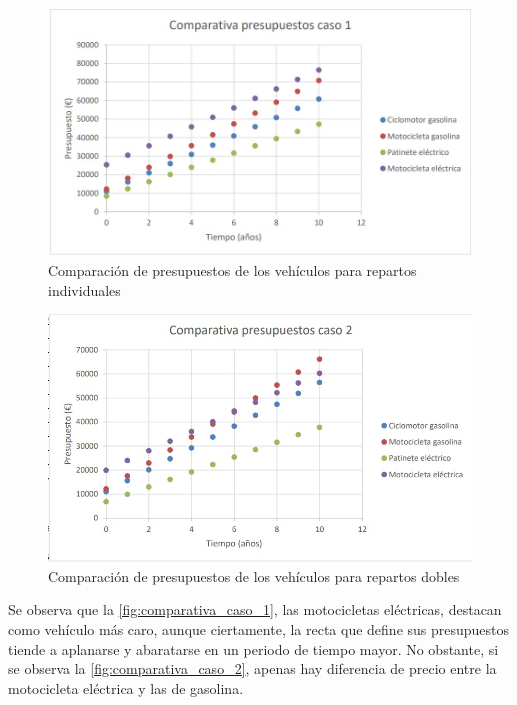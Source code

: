 \begin{figure}[h]
    \centering
    \includegraphics[scale = 0.4]{archivos/Comparativa_presupuestos_caso_1.jpeg}
    \caption{Comparación de presupuestos de los vehículos para repartos individuales}
    \label{fig:comparativa_caso_1}
\end{figure}

\begin{figure}[h]
    \centering
    \includegraphics[scale = 0.4]{archivos/Comparativa_presupuestos_caso_2.jpeg}
    \caption{Comparación de presupuestos de los vehículos para repartos dobles}
    \label{fig:comparativa_caso_2}
\end{figure}

Se observa que la \autoref{fig:comparativa_caso_1}, las motocicletas eléctricas, destacan como vehículo más caro, aunque ciertamente, la recta que define sus presupuestos tiende a aplanarse y abaratarse en un periodo de tiempo mayor. No obstante, si se observa la \autoref{fig:comparativa_caso_2}, apenas hay diferencia de precio entre la motocicleta eléctrica y las de gasolina.



